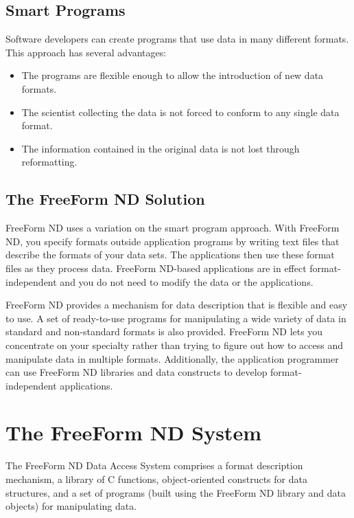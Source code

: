 \subsection{Smart Programs}

Software developers can create programs that use data in many
different formats. This approach has several advantages:

\begin{itemize}
\item The programs are flexible enough to allow the introduction of
  new data formats.
  
\item The scientist collecting the data is not forced to conform to
  any single data format.
  
\item The information contained in the original data is not lost
  through reformatting.
\end{itemize}

\subsection{The FreeForm ND Solution}

FreeForm ND uses a variation on the smart program approach. With
FreeForm ND, you specify formats outside application programs by
writing text files that describe the formats of your data sets. The
applications then use these format files as they process data.
FreeForm ND-based applications are in effect format-independent and
you do not need to modify the data or the applications.

FreeForm ND provides a mechanism for data description that is flexible
and easy to use. A set of ready-to-use programs for manipulating a
wide variety of data in standard and non-standard formats is also
provided. FreeForm ND lets you concentrate on your specialty rather
than trying to figure out how to access and manipulate data in
multiple formats. Additionally, the application programmer can use
FreeForm ND libraries and data constructs to develop
format-independent applications.

\section{The FreeForm ND System}

The FreeForm ND Data Access System comprises a format description
mechanism, a library of C functions, object-oriented constructs for
data structures, and a set of programs (built using the FreeForm ND
library and data objects) for manipulating data.

